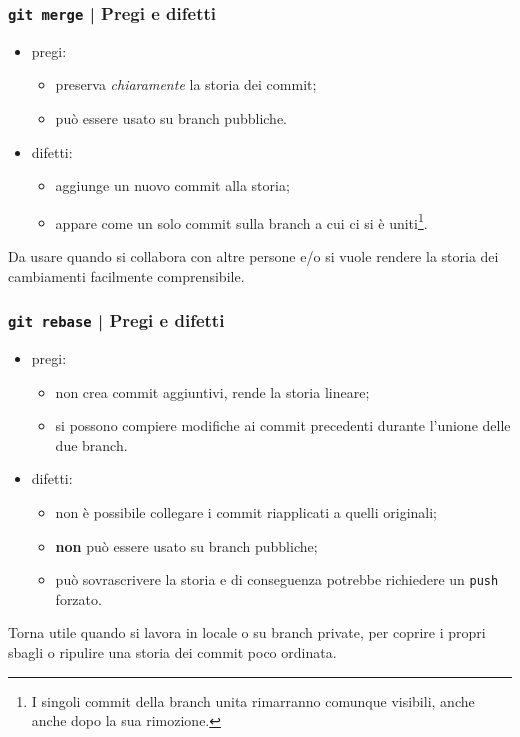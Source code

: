 \documentclass{beamer}
\begin{document}
\begin{frame}
  \frametitle{\texttt{git merge} | Pregi e difetti}
  \begin{itemize}
    \item pregi: \begin{itemize}
      \item preserva \emph{chiaramente} la storia dei commit;
      \item pu\`o essere usato su branch pubbliche.
    \end{itemize}
    \item difetti: \begin{itemize}
      \item aggiunge un nuovo commit alla storia;
      \item appare come un solo commit sulla branch a cui ci si \`e uniti\footnote{
          I singoli commit della branch unita rimarranno comunque visibili, anche
          anche dopo la sua rimozione.
        }.
    \end{itemize}
  \end{itemize}

  Da usare quando si collabora con altre persone e/o si vuole rendere la storia
  dei cambiamenti facilmente comprensibile.
\end{frame}

\begin{frame}
  \frametitle{\texttt{git rebase} | Pregi e difetti}
  \begin{itemize}
    \item pregi: \begin{itemize}
      \item non crea commit aggiuntivi, rende la storia lineare;
      \item si possono compiere modifiche ai commit precedenti durante l'unione
        delle due branch.
    \end{itemize}
    \item difetti: \begin{itemize}
      \item non \`e possibile collegare i commit riapplicati a quelli originali;
      \item \textbf{non} pu\`o essere usato su branch pubbliche;
      \item pu\`o sovrascrivere la storia e di conseguenza potrebbe
        richiedere un \texttt{push} forzato.
    \end{itemize}
  \end{itemize}

  Torna utile quando si lavora in locale o su branch private, per coprire i
  propri sbagli o ripulire una storia dei commit poco ordinata.
\end{frame}
\end{document}
